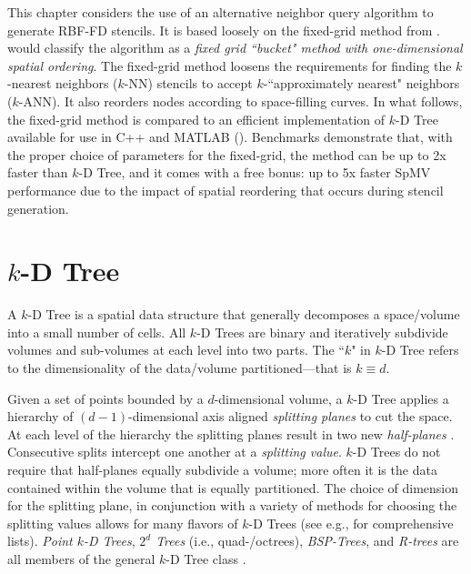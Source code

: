 \documentclass{report}
\begin{document}
This chapter considers the use of an alternative neighbor query algorithm to generate RBF-FD stencils. It is based loosely on the fixed-grid method from \cite{Krog2010,Green2010,Johnson2011}. \cite{Samet2005} would classify the algorithm as a \emph{fixed grid ``bucket" method with one-dimensional spatial ordering}. The fixed-grid method loosens the requirements for finding the $k$-nearest neighbors ($k$-NN) stencils to accept $k$-``approximately nearest" neighbors ($k$-ANN). It also reorders nodes according to space-filling curves. In what follows, the fixed-grid method is compared to an efficient implementation of $k$-D Tree available for use in C++ and MATLAB (\cite{TagliasacchiMFE}). Benchmarks demonstrate that, with the proper choice of parameters for the fixed-grid, the method can be up to 2x faster than $k$-D Tree, and it comes with a free bonus: up to 5x faster SpMV performance due to the impact of spatial reordering that occurs during stencil generation. 


\section{$k$-D Tree}

A $k$-D Tree is a spatial data structure that generally decomposes a space/volume into a small number of cells. All $k$-D Trees are binary and iteratively subdivide volumes and sub-volumes at each level into two parts. The ``$k$" in $k$-D Tree refers to the dimensionality of the data/volume  partitioned---that is $k \equiv d$. 


Given a set of points bounded by a $d$-dimensional volume, a $k$-D Tree applies a hierarchy of $(d-1)$-dimensional axis aligned \emph{splitting planes} to cut the space. At each level of the hierarchy the splitting planes result in two new \emph{half-planes} \cite{Skiena2008}. Consecutive splits intercept one another at a \emph{splitting value}. $k$-D Trees do not require that half-planes equally subdivide a volume; more often it is the data contained within the volume that is equally partitioned. The choice of dimension for the splitting plane, in conjunction with a variety of methods for choosing the splitting values allows for many flavors of $k$-D Trees (see e.g., \cite{Samet2005, Skiena2008, Berg2008} for comprehensive lists). \emph{Point $k$-D Trees}, \emph{$2^d$ Trees} (i.e., quad-/octrees), \emph{BSP-Trees}, and \emph{R-trees} are all members of the general $k$-D Tree class \cite{Skiena2008,Ying2006}.
\end{document}
